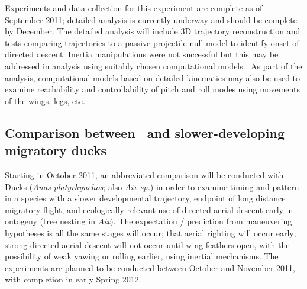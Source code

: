 Experiments and data collection for this experiment are complete as of September 2011; detailed analysis is currently underway and should be complete by December.  The detailed analysis will include 3D trajectory reconstruction and tests comparing trajectories to a passive projectile null model to identify onset of directed descent.  Inertia manipulations were not successful but this may be addressed in analysis using suitably chosen computational models \citep{Jusufi:2008}.  As part of the analysis, computational models based on detailed kinematics may also be used to examine reachability and controllability of pitch and roll modes using movements of the wings, legs, etc. 

\subsection{Comparison between \Achukar\ and slower-developing migratory ducks}
Starting in October 2011, an abbreviated comparison will be conducted with Ducks (\emph{Anas platyrhynchos}; also \emph{Aix sp.}) in order to examine timing and pattern in a species with a slower developmental trajectory, endpoint of long distance migratory flight, and ecologically-relevant use of directed aerial descent early in ontogeny (tree nesting in \emph{Aix}).  The expectation / prediction from maneuvering hypotheses is all the same stages will occur; that aerial righting will occur early; strong directed aerial descent will not occur until wing feathers open, with the possibility of weak yawing or rolling earlier, using inertial mechanisms.  The experiments are planned to be conducted between October and November 2011, with completion in early Spring 2012. 

